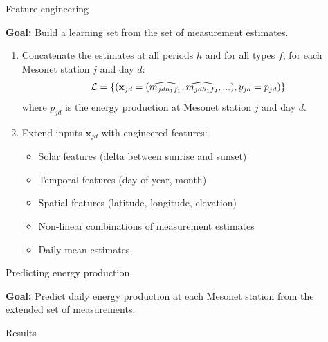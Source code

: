 \documentclass[handout]{beamer}
\begin{document}
\begin{frame}{Feature engineering}

\textbf{Goal:} Build a learning set from the set of measurement estimates.

\begin{enumerate}

\item Concatenate the estimates at all periods $h$ and for all types $f$, for each Mesonet station $j$ and day $d$: $${\cal L} = \{ (\mathbf{x}_{jd} = (\widehat{m_{jd{h_1}{f_1}}}, \widehat{m_{jd{h_1}{f_2}}}, ...), y_{jd} = p_{jd}) \}$$ where $p_{jd}$ is the energy production at Mesonet station $j$ and day $d$.

\item Extend inputs $\mathbf{x}_{jd}$ with engineered features:
\begin{itemize}
\item Solar features (delta between sunrise and sunset)
\item Temporal features (day of year, month)
\item Spatial features (latitude, longitude, elevation)
\item Non-linear combinations of measurement estimates
\item Daily mean estimates
\end{itemize}

\end{enumerate}

\end{frame}



\begin{frame}{Predicting energy production}

\textbf{Goal:} Predict daily energy production at each Mesonet station from the extended set of measurements.

\end{frame}



\begin{frame}{Results}

\end{frame}
\end{document}
